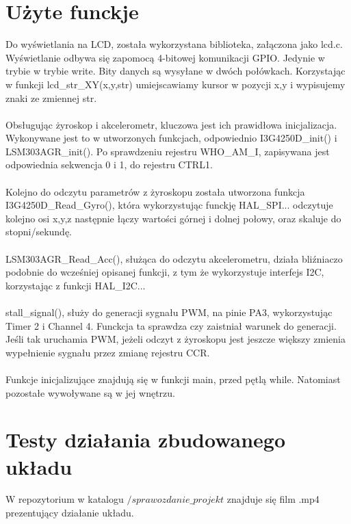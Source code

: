 \documentclass[12pt]{article}
\begin{document}
\section{Użyte funckje}

Do wyświetlania na LCD, została wykorzystana biblioteka, załączona jako lcd.c. Wyświetlanie odbywa się zapomocą 4-bitowej komunikacji GPIO. Jedynie w trybie w trybie write. Bity danych są wysyłane w dwóch połówkach. Korzystając w funkcji lcd\_str\_XY(x,y,str) umiejscawiamy kursor w pozycji x,y i wypisujemy znaki ze zmiennej str.
\\
\\
Obsługując żyroskop i akcelerometr, kluczowa jest ich prawidłowa inicjalizacja. Wykonywane jest to w utworzonych funkcjach, odpowiednio I3G4250D\_init() i LSM303AGR\_init(). Po sprawdzeniu rejestru WHO\_AM\_I, zapisywana jest odpowiednia sekwencja 0 i 1, do rejestru CTRL1. 
\\
\\
Kolejno do odczytu parametrów z żyroskopu została utworzona funkcja I3G4250D\_Read\_Gyro(), która wykorzystując funckję HAL\_SPI... odczytuje kolejno osi x,y,z następnie łączy wartości górnej i dolnej połowy, oraz skaluje do stopni/sekundę.
\\
\\
LSM303AGR\_Read\_Acc(), służąca do odczytu akcelerometru, działa bliźniaczo podobnie do wcześniej opisanej funkcji, z tym że wykorzystuje interfejs I2C, korzystając z funkcji HAL\_I2C...
\\
\\
stall\_signal(), służy do generacji sygnału PWM, na pinie PA3, wykorzystując Timer 2 i Channel 4. Funckcja ta sprawdza czy zaistniał warunek do generacji. Jeśli tak uruchamia PWM, jeżeli odczyt z żyroskopu jest jeszcze większy zmienia wypełnienie sygnału przez zmianę rejestru CCR.
\\
\\
Funkcje inicjalizujące znajdują się w funkcji main, przed pętlą while. Natomiast pozostałe wywoływane są w jej wnętrzu.

\section{Testy działania zbudowanego układu}

        W repozytorium w katalogu $/sprawozdanie\_projekt$ znajduje się film .mp4 prezentujący działanie układu. \\
        
\end{document}
